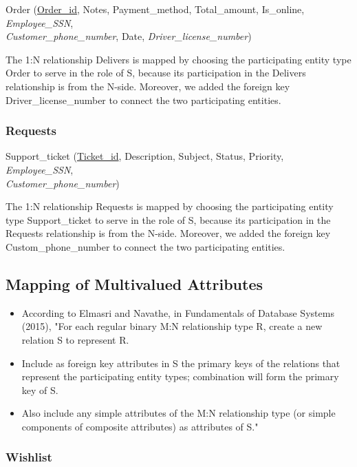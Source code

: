 \documentclass[11pt]{article}
\begin{document}
Order (\underline{Order\_id}, Notes, Payment\_method, Total\_amount, Is\_online, \textit{Employee\_SSN}, \\
\textit{Customer\_phone\_number}, Date, \textit{Driver\_license\_number})

The 1:N relationship Delivers is mapped by choosing the participating entity type Order to serve in the role of S, because its participation in the Delivers relationship is from the N-side. Moreover, we added the foreign key Driver\_license\_number to connect the two participating entities.

\subsubsection{Requests}

Support\_ticket (\underline{Ticket\_id}, Description, Subject, Status, Priority, \textit{Employee\_SSN}, \\
\textit{Customer\_phone\_number})

The 1:N relationship Requests is mapped by choosing the participating entity type Support\_ticket to serve in the role of S, because its participation in the Requests relationship is from the N-side. Moreover, we added the foreign key Custom\_phone\_number to connect the two participating entities.

\subsection{Mapping of Multivalued Attributes}

\begin{itemize}
  \item According to Elmasri and Navathe, in Fundamentals of Database Systems (2015), "For each regular binary M:N relationship type R, create a new relation S to represent R.
  \item Include as foreign key attributes in S the primary keys of the relations that represent the participating entity types; combination will form the primary key of S.
  \item Also include any simple attributes of the M:N relationship type (or simple components of composite attributes) as attributes of S." \cite{elmasri}
\end{itemize}

\subsubsection{Wishlist}
\end{document}
